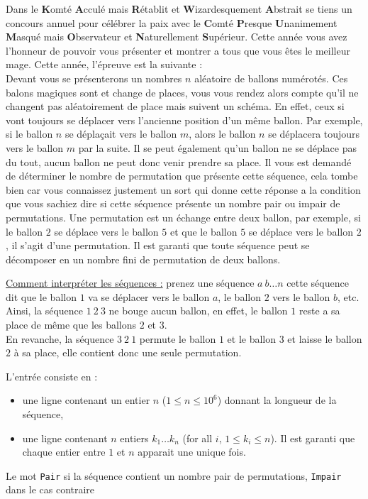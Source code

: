 \problemname{\problemyamlname}


Dans le \textbf{K}omté \textbf{A}cculé mais \textbf{R}établit et \textbf{W}izardesquement \textbf{A}bstrait se tiens un concours annuel pour célébrer la paix avec le \textbf{C}omté \textbf{P}resque \textbf{U}nanimement \textbf{M}asqué mais \textbf{O}bservateur et \textbf{N}aturellement \textbf{S}upérieur.
Cette année vous avez l'honneur de pouvoir vous présenter et montrer a tous que vous êtes le meilleur mage. Cette année, l'épreuve est la suivante : \\

Devant vous se présenterons un nombres $n$ aléatoire de ballons numérotés. Ces balons magiques sont et change de places, vous vous rendez alors compte qu'il ne changent pas aléatoirement de place mais suivent un schéma. En effet, ceux si vont toujours se déplacer vers l'ancienne position d'un même ballon.
Par exemple, si le ballon $n$ se déplaçait vers le ballon $m$, alors le ballon $n$ se déplacera toujours vers le ballon $m$ par la suite. Il se peut également qu'un ballon ne se déplace pas du tout, aucun ballon ne peut donc venir prendre sa place.
Il vous est demandé de déterminer le nombre de permutation que présente cette séquence, cela tombe bien car vous connaissez justement un sort qui donne cette réponse a la condition que vous sachiez dire si cette séquence présente un nombre pair ou impair de permutations.
Une permutation est un échange entre deux ballon, par exemple, si le ballon $2$ se déplace vers le ballon $5$ et que le ballon $5$ se déplace vers le ballon $2$, il s'agit d'une permutation.
Il est garanti que toute séquence peut se décomposer en un nombre fini de permutation de deux ballons.

\underline{Comment interpréter les séquences :} prenez une séquence $a\ b \dots n$ cette séquence dit que le ballon $1$ va se déplacer vers le ballon $a$, le ballon $2$ vers le ballon $b$, etc.\\
Ainsi, la séquence $1\ 2\ 3$ ne bouge aucun ballon, en effet, le ballon $1$ reste a sa place de même que les ballons $2$ et $3$.\\
En revanche, la séquence $3\ 2\ 1$ permute le ballon $1$ et le ballon $3$ et laisse le ballon $2$ à sa place, elle contient donc une seule permutation.

\begin{Input}
    L'entrée consiste en :
    \begin{itemize}
        \item une ligne contenant un entier $n$ ($1 \le n \le 10^6$) donnant la longueur de la séquence,
        \item une ligne contenant $n$ entiers $k_1 \dots k_n$ (for all $i$, $1 \le k_i \le n$). Il est garanti que chaque entier entre $1$ et $n$ apparait une unique fois.
    \end{itemize}
\end{Input}

\begin{Output}
    Le mot \texttt{Pair} si la séquence contient un nombre pair de permutations, \texttt{Impair} dans le cas contraire
\end{Output}
